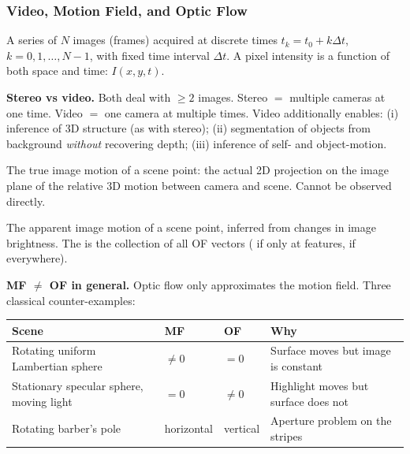\bigseparator

\subsubsection{Video, Motion Field, and Optic Flow}

\begin{defbox}[Video]
A series of $N$ images (frames) acquired at discrete times $t_k = t_0 + k\Delta t$, $k = 0,1,\dots,N-1$, with fixed time interval $\Delta t$. A pixel intensity is a function of both space and time: $I(x,y,t)$.
\end{defbox}

\textbf{Stereo vs video.} Both deal with $\geq 2$ images. Stereo $=$ multiple cameras at one time. Video $=$ one camera at multiple times. Video additionally enables: (i) inference of 3D structure (as with stereo); (ii) segmentation of objects from background \emph{without} recovering depth; (iii) inference of self- and object-motion.

\separator

\begin{defbox}
The true image motion of a scene point: the actual 2D projection on the image plane of the relative 3D motion between camera and scene. Cannot be observed directly.
\end{defbox}

\begin{defbox}
The apparent image motion of a scene point, inferred from changes in image brightness. The  is the collection of all OF vectors ( if only at features,  if everywhere).
\end{defbox}

\textbf{MF $\neq$ OF in general.} Optic flow only approximates the motion field. Three classical counter-examples:

\begin{center}
\renewcommand{\arraystretch}{1.3}
\begin{tabular}{@{} l l l l @{}}
\toprule
\textbf{Scene} & \textbf{MF} & \textbf{OF} & \textbf{Why} \\
\midrule
Rotating uniform Lambertian sphere & $\neq 0$ & $= 0$ & Surface moves but image is constant \\
Stationary specular sphere, moving light & $= 0$ & $\neq 0$ & Highlight moves but surface does not \\
Rotating barber's pole & horizontal & vertical & Aperture problem on the stripes \\
\bottomrule
\end{tabular}
\end{center}


